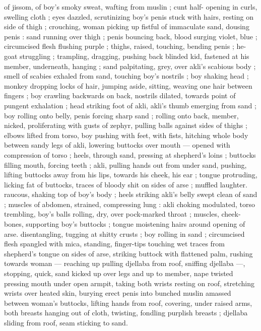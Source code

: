 of jissom, of boy's smoky sweat, wafting from muslin ; cunt half- 
opening in curls, swelling cloth ; eyes dazzled, scrutinizing boy's 
penis stuck with hairs, resting on side of thigh ; crouching, woman 
picking up fistful of immaculate sand, dousing penis : sand running 
over thigh ; penis bouncing back, blood surging violet, blue ; 
circumcised flesh flushing purple ; thighs, raised, touching, bending 
penis ; he-goat struggling ; trampling, dragging, pushing back 
blinded kid, fastened at his member, underneath, hanging ; sand 
palpitating, grey, over akli's scabious body ; smell of scabies exhaled 
from sand, touching boy's nostrils ; boy shaking head ; monkey 
dropping locks of hair, jumping aside, sitting, weaving one hair 
between fingers ; boy crawling backwards on back, nostrils dilated, 
towards point of pungent exhalation ; head striking foot of akli, akli's 
thumb emerging from sand ; boy rolling onto belly, penis forcing 
sharp sand ; rolling onto back, member, nicked, proliferating with 
gusts of zephyr, pulling balls against sides of thighs ; elbows lifted 
from torso, boy pushing with feet, with fists, hitching whole body 
between sandy legs of akli, lowering buttocks over mouth --- opened 
with compression of torso ; heels, through sand, pressing at 
shepherd's loins ; buttocks filling mouth, forcing teeth ; akli, pulling 
hands out from under sand, pushing, lifting buttocks away from his 
lips, towards his cheek, his ear ; tongue protruding, licking fat of 
buttocks, traces of bloody shit on sides of arse ; muffled laughter. 
raucous, shaking top of boy's body ; heels striking akli's belly swept 
clean of sand ; muscles of abdomen, strained, compressing lung : 
akli choking modulated, torso trembling, boy's balls rolling, dry, over 
pock-marked throat ; muscles, cheek-bones, supporting boy's 
buttocks ; tongue moistening hairs around opening of arse. 
disentangling, tugging at shitty crusts ; boy rolling in sand ; 
circumcised flesh spangled with mica, standing, finger-tips touching 
wet traces from shepherd's tongue on sides of arse, striking buttock 
with flattened palm, rushing towards woman --- reaching up pulling 
djellaba from roof, sniffing djellaba ---, stopping, quick, sand kicked 
up over legs and up to member, nape twisted pressing mouth under 
open armpit, taking both wrists resting on roof, stretching wrists over 
heated skin, burying erect penis into bunched muslin amassed 
between woman's buttocks, lifting hands from roof, covering, under 
raised arms, both breasts hanging out of cloth, twisting, fondling 
purplish breasts ; djellaba sliding from roof, seam sticking to sand. 
